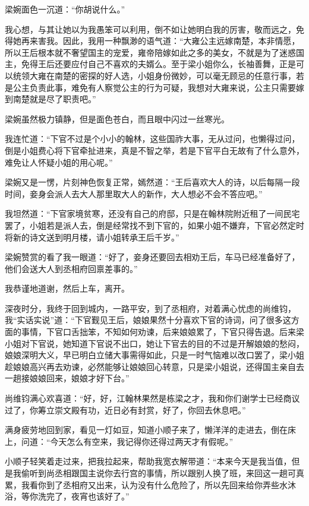 梁婉面色一沉道：“你胡说什么。”

我心想，与其让她以为我愚笨可以利用，倒不如让她明白我的厉害，敬而远之，免得她再来害我。因此，我用一种飘渺的语气道：“大雍公主远嫁南楚，本非情愿，所以王后根本就不奢望国主的宠爱，雍帝陪嫁如此之多的美女，不就是为了迷惑国主，免得王后还要应付自己不喜欢的夫婿么。至于梁小姐你么，长袖善舞，正是可以统领大雍在南楚的密探的好人选，小姐身份微妙，可以毫无顾忌的任意行事，若是公主负责此事，难免有人察觉公主的行为可疑，我想对大雍来说，公主只需要嫁到南楚就是尽了职责吧。”

梁婉虽然极力镇静，但是面色苍白，而且眼中闪过一丝寒光。

我连忙道：“下官不过是个小小的翰林，这些国祚大事，无从过问，也懒得过问，倒是小姐费心将下官牵扯进来，真是不智之举，若是下官平白无故有了什么意外，难免让人怀疑小姐的用心呢。”

梁婉又是一愣，片刻神色恢复正常，嫣然道：“王后喜欢大人的诗，以后每隔一段时间，妾身会派人去大人那里取大人的新作，大人想必不会不答应吧。”

我坦然道：“下官家境贫寒，还没有自己的府邸，只是在翰林院附近租了一间民宅罢了，小姐若是派人去，倒是经常找不到下官的，如果小姐不嫌弃，下官必然定时将新的诗文送到明月楼，请小姐转承王后千岁。”

梁婉赞赏的看了我一眼道：“好了，妾身还要回去相劝王后，车马已经准备好了，他们会送大人到丞相府回禀差事的。”

我恭谨地道谢，然后上车，离开。

深夜时分，我终于回到城内，一路平安，到了丞相府，对着满心忧虑的尚维钧，我“实话实说”道：“下官觐见王后，娘娘果然十分喜欢下官的诗词，问了很多这方面的事情，下官口舌拙笨，不知如何劝谏，后来娘娘累了，下官只得告退。后来梁小姐对下官说，她知道下官说不出口，她让下官去的目的不过是开解娘娘的愁闷，娘娘深明大义，早已明白立储大事需得如此，只是一时气恼难以改口罢了，梁小姐趁娘娘高兴再去劝谏，必然能够让娘娘回心转意，只是梁小姐说，还得国主亲自去一趟接娘娘回来，娘娘才好下台。”

尚维钧满心欢喜道：“好，好，江翰林果然是栋梁之才，我和你们谢学士已经商议过了，你筹立崇文殿有功，近日必有封赏，好了，你回去休息吧。”

满身疲劳地回到家，看见一灯如豆，知道小顺子来了，懒洋洋的走进去，倒在床上，问道：“今天怎么有空来，我记得你还得过两天才有假呢。”

小顺子轻笑着走过来，把我拉起来，帮助我宽衣解带道：“本来今天是我当值，但是我偷听到尚丞相跟国主说你去行宫的事情，所以跟别人换了班，来回这一趟可真累，我看你到了丞相府又出来，认为没有什么危险了，所以先回来给你弄些水沐浴，等你洗完了，夜宵也该好了。”

